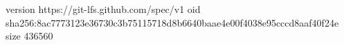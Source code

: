version https://git-lfs.github.com/spec/v1
oid sha256:8ac7773123e36730c3b75115718d8b6640baae4e00f4038e95cccd8aaf40f24e
size 436560
